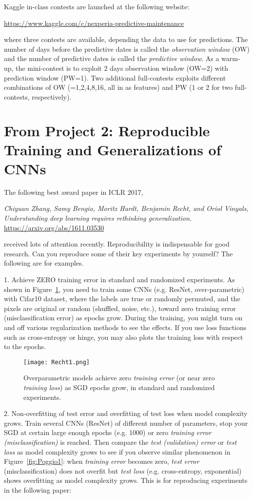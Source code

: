 \documentclass[11pt]{article}
\begin{document}
Kaggle in-class contests are launched at the following website:

\url{https://www.kaggle.com/c/nexperia-predictive-maintenance}

\noindent where three contests are available, depending the data to use for predictions. The number of days before the predictive dates is called the \emph{observation window} (OW) and the number of predictive dates is called the \emph{predictive window}. As a warm-up, the mini-contest is to exploit 2 days observation window (OW=2) with prediction window (PW=1). Two additional full-contests exploits different combinations of OW (=1,2,4,8,16, all in as features) and PW (1 or 2 for two full-contests, respectively). 

\section{From Project 2: Reproducible Training and Generalizations of CNNs} 

The following best award paper in ICLR 2017, 

\emph{Chiyuan Zhang, Samy Bengio, Moritz Hardt, Benjamin Recht, and Oriol Vinyals, Understanding deep learning requires rethinking generalization.} \url{https://arxiv.org/abs/1611.03530}

\noindent received lots of attention recently. Reproducibility is indispensable for good research. Can you reproduce some of their key experiments by yourself? The following are for examples. 

1. Achieve ZERO training error in standard and randomized experiments. As shown in Figure~\ref{fig:Recht1}, you need to train some CNNs (e.g. ResNet, over-parametric) with Cifar10 dataset, where the labels are true or randomly permuted, and the pixels are original or random (shuffled, noise, etc.), toward zero training error (misclassification error) as epochs grow. During the training, you might turn on and off various regularization methods to see the effects. If you use loss functions such as cross-entropy or hinge, you may also plots the training loss with respect to the epochs. 
\begin{figure}
\center
\texttt{[image: Recht1.png]}  
\caption{Overparametric models achieve zero \emph{training error} (or near zero \emph{training loss}) as SGD epochs grow, in standard and randomized experiments.}
\label{fig:Recht1}
\end{figure}

2. Non-overfitting of test error and overfitting of test loss when model complexity grows. Train several CNNs (ResNet) of different number of parameters, stop your SGD at certain large enough epochs (e.g. 1000) or zero \emph{training error (misclassification)} is reached. Then compare the \emph{test (validation) error} or \emph{test loss} as model complexity grows to see if you observe similar phenomenon in Figure~\ref{fig:Poggio1}: when \emph{training error} becomes zero, \emph{test error} (misclassification) does not overfit but \emph{test loss} (e.g. cross-entropy, exponential) shows overfitting as model complexity grows. This is for reproducing experiments in the following paper: 
\end{document}
